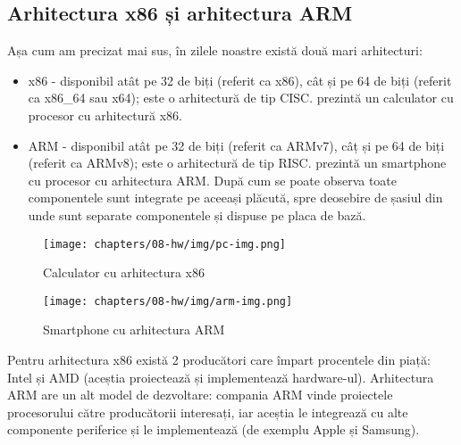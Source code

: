 \subsection{Arhitectura x86 și arhitectura ARM}
\label{sec:hw:class:x86-arm}

Așa cum am precizat mai sus, în zilele noastre există două mari arhitecturi:

\begin{itemize}
	\item x86 - disponibil atât pe 32 de biți (referit ca x86), cât și pe 64
		de biți (referit ca x86\_64 sau x64); este o arhitectură de tip
		CISC.  prezintă un calculator cu procesor cu arhitectură x86.

	\item ARM - disponibil atât pe 32 de biți (referit ca ARMv7), câț și pe
		64 de biți (referit ca ARMv8); este o arhitectură de tip RISC.
		 prezintă un smartphone cu procesor cu arhitectura
		ARM. După cum se poate observa toate componentele sunt integrate
                pe aceeași plăcută, spre deosebire de șasiul din  unde sunt separate componentele și dispuse pe placa de bază.
\end{itemize}

\begin{figure}[!htbp]
	\centering
	\texttt{[image: chapters/08-hw/img/pc-img.png]}
	\caption{Calculator cu arhitectura x86\protect\footnotemark}
	\label{fig:hw:x86}
\end{figure}


\begin{figure}[!htbp]
	\centering
	\texttt{[image: chapters/08-hw/img/arm-img.png]}
	\caption{Smartphone cu arhitectura ARM\protect\footnotemark}
	\label{fig:hw:arm}
\end{figure}


Pentru arhitectura x86 există 2 producători care împart procentele din piață:
Intel și AMD (aceștia proiectează și implementează hardware-ul). Arhitectura ARM
are un alt model de dezvoltare: compania ARM vinde proiectele procesorului către
producătorii interesați, iar aceștia le integrează cu alte componente periferice
și le implementează (de exemplu Apple și Samsung).

